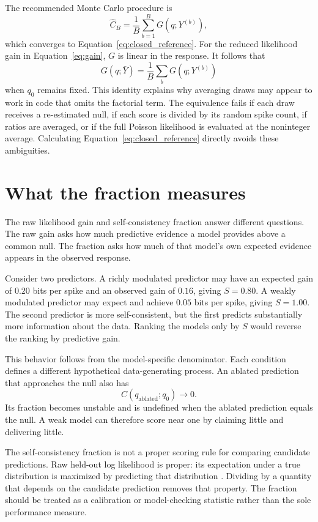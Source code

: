 \documentclass[11pt]{article}
\begin{document}
The recommended Monte Carlo procedure is
\begin{equation}
\widehat C_B
=
\frac{1}{B}\sum_{b=1}^B G(q;Y^{(b)}),
\end{equation}
which converges to Equation~\ref{eq:closed_reference}. For the reduced likelihood gain in Equation~\ref{eq:gain}, $G$ is linear in the response. It follows that
\begin{equation}
G(q;\bar Y)
=
\frac{1}{B}\sum_bG(q;Y^{(b)})
\end{equation}
when $q_0$ remains fixed. This identity explains why averaging draws may appear to work in code that omits the factorial term. The equivalence fails if each draw receives a re-estimated null, if each score is divided by its random spike count, if ratios are averaged, or if the full Poisson likelihood is evaluated at the noninteger average. Calculating Equation~\ref{eq:closed_reference} directly avoids these ambiguities.

\section{What the fraction measures}

The raw likelihood gain and self-consistency fraction answer different questions. The raw gain asks how much predictive evidence a model provides above a common null. The fraction asks how much of that model's own expected evidence appears in the observed response.

Consider two predictors. A richly modulated predictor may have an expected gain of $0.20$ bits per spike and an observed gain of $0.16$, giving $S=0.80$. A weakly modulated predictor may expect and achieve $0.05$ bits per spike, giving $S=1.00$. The second predictor is more self-consistent, but the first predicts substantially more information about the data. Ranking the models only by $S$ would reverse the ranking by predictive gain.

This behavior follows from the model-specific denominator. Each condition defines a different hypothetical data-generating process. An ablated prediction that approaches the null also has
\begin{equation}
C(q_{\mathrm{ablated}};q_0)\rightarrow0.
\end{equation}
Its fraction becomes unstable and is undefined when the ablated prediction equals the null. A weak model can therefore score near one by claiming little and delivering little.

The self-consistency fraction is not a proper scoring rule for comparing candidate predictions. Raw held-out log likelihood is proper: its expectation under a true distribution is maximized by predicting that distribution \cite{gneiting2007}. Dividing by a quantity that depends on the candidate prediction removes that property. The fraction should be treated as a calibration or model-checking statistic rather than the sole performance measure.
\end{document}
